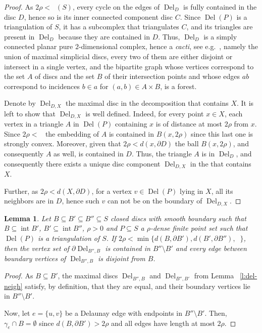 \documentclass[reqno,english]{amsart}
\newtheorem{lemma}[theorem]{Lemma}
\numberwithin{claimcounter}{theorem}
\theoremstyle{remark}
\theoremstyle{definition}
\numberwithin{theorem}{section}
\DeclareMathOperator{\interior}{int}
\DeclareMathOperator{\rscv}{r_{scv}}
\DeclareMathOperator{\Del}{Del}
\begin{document}
\begin{proof}
As $2\rho < \rscv(S)$,
every cycle on the edges of $\Del_D$ is fully contained in the disc $D$,
hence so is its inner connected component disc $C$. Since $\Del(P)$ is a triangulation of $S$, it has a subcomplex that triangulates $C$, and its triangles are present in $\Del_D$ because they are contained in $D$.
Thus, $\Del_D$ is a simply connected planar pure $2$-dimensional complex, hence a \emph{cacti}, see e.g.~\cite{cacti-cohen2002homotopy}, namely the union of maximal simplicial discs, every two of them are either disjoint or intersect in a single vertex, and the bipartite graph whose vertices correspond to the set $A$ of discs and the set $B$ of their intersection points and whose edges $ab$ correspond to incidences $b\in a$ for $(a,b)\in A\times B$, is a forest.

Denote by $\Del_{D,X}$ the maximal disc in the  decomposition that contains $X$. 
It is left to show that $\Del_{D,X}$ is well defined. Indeed, for every point 
$x\in X$, each vertex in a triangle $A$ in $\Del(P)$ containing $x$ is of distance at most $2\rho$ from $x$. Since $2\rho <\rscv$ the embedding of $A$ is contained in $B(x,2\rho)$ since this last one is strongly convex. Moreover, given that $2\rho < d(x,\partial D)$ the ball $B(x,2\rho)$, and consequently $A$ as well, is contained in $D$. Thus, the triangle $A$ is in $\Del_D$, and consequently there exists a unique disc component $\Del_{D,X}$ in the  that contains $X$. 

Further, as $2\rho < d(X,\partial D)$, for a vertex $v\in\Del(P)$ lying in $X$, all its neighbors are in $D$, hence such $v$ can not be on the boundary of $\Del_{D,X}$.
\end{proof}

\begin{lemma}
    \label{l:vertexedge-containment}
    Let $B\subseteq B'\subseteq B''\subseteq S$ closed discs with smooth boundary such that $B\subseteq \interior B'$, $B'\subseteq \interior B''$, $\rho>0$ and $P\subseteq S$ a $\rho$-dense finite point set such that $\Del(P)$ is a triangulation of $S$.
    If $2\rho < \min \{d(B,\partial B'), d(B',\partial B''), \rscv\}$, then 
    the vertex set of $\partial \Del_{B'',B}$ is contained in $B''\setminus B'$ and every edge between boundary vertices of $\Del_{B'',B}$ is 
    disjoint from $B$.
\end{lemma}
\begin{proof}

As $B\subseteq B'$, 
the maximal discs $\Del_{B'',B}$ and $\Del_{B'',B'}$ from Lemma~ \ref{l:del-neigh} satisfy, by definition, that they are equal, and their boundary vertices lie in $B''\setminus B'$. 

    Now, let $e=\{u,v\}$ be a Delaunay edge with endpoints in $B''\setminus B'$. Then,  
    $\gamma_e \cap B = \emptyset$  
    since $d(B,\partial B')>2\rho$ and all edges have length at most $2\rho$.
\end{proof}
\end{document}
